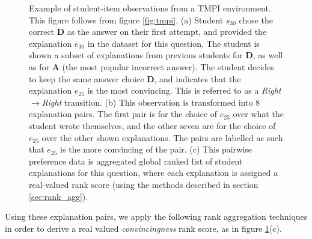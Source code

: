 \documentclass[notitlepage,12pt]{jedm}
\begin{document}
\begin{figure}[H]
	\centering
	\def\svgscale{0.40}
	
	\caption{
	Example of student-item observations from a TMPI environment. 
	This figure follows from figure \protect\ref{fig:tmpi}.
	(a) Student $s_{30}$ chose the correct \textbf{D} as the answer on 
	their first attempt, and provided the explanation $e_{30}$ in the 
	dataset for this question. 
	The student is shown a subset of explanations from previous students for 
	\textbf{D}, as well as for \textbf{A} (the most popular incorrect 
	answer). 
	The student decides to keep the same answer choice \textbf{D}, and 
	indicates that the explanation $e_{25}$ is the most convincing.
	This is referred to as a \textit{Right}$\rightarrow$\textit{Right} 
	transition.
	(b) This observation is transformed into 8 explanation pairs. The first 
	pair is for the choice of $e_{25}$ over what the student wrote themselves, 
	and the other seven are for the choice of $e_{25}$ over the other shown 
	explanations. 
	The pairs are labelled as such that $e_{25}$ is the more convincing of the 
	pair. 
	(c) This pairwise preference data is aggregated global ranked list of 
	student explanations for this question, where each explanation is assigned 
	a real-valued rank score (using the methods described in section 
	\protect\ref{sec:rank_agg}).
}
\label{fig:make_pairs_a}
\end{figure}

Using these explanation pairs, we apply the following rank aggregation 
techniques in order to derive a real valued \textit{convincingness} rank score, 
as in figure \ref{fig:make_pairs_a}(c).
\end{document}
